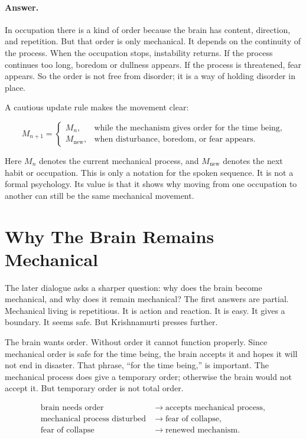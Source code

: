 \paragraph{Answer.}
In occupation there is a kind of order because the brain has content, direction, and repetition. But that order is only mechanical. It depends on the continuity of the process. When the occupation stops, instability returns. If the process continues too long, boredom or dullness appears. If the process is threatened, fear appears. So the order is not free from disorder; it is a way of holding disorder in place.

A cautious update rule makes the movement clear:

\begin{equation}
M_{n+1}
=
\begin{cases}
M_n, & \text{while the mechanism gives order for the time being},\\
M_{\mathrm{new}}, & \text{when disturbance, boredom, or fear appears}.
\end{cases}
\end{equation}

Here \(M_n\) denotes the current mechanical process, and \(M_{\mathrm{new}}\) denotes the next habit or occupation. This is only a notation for the spoken sequence. It is not a formal psychology. Its value is that it shows why moving from one occupation to another can still be the same mechanical movement.

\section{Why The Brain Remains Mechanical}

The later dialogue asks a sharper question: why does the brain become mechanical, and why does it remain mechanical? The first answers are partial. Mechanical living is repetitious. It is action and reaction. It is easy. It gives a boundary. It seems safe. But Krishnamurti presses further.

The brain wants order. Without order it cannot function properly. Since mechanical order is safe for the time being, the brain accepts it and hopes it will not end in disaster. That phrase, ``for the time being,'' is important. The mechanical process does give a temporary order; otherwise the brain would not accept it. But temporary order is not total order.

\begin{align}
\text{brain needs order}
&\longrightarrow
\text{accepts mechanical process}, \\
\text{mechanical process disturbed}
&\longrightarrow
\text{fear of collapse}, \\
\text{fear of collapse}
&\longrightarrow
\text{renewed mechanism}.
\end{align}

